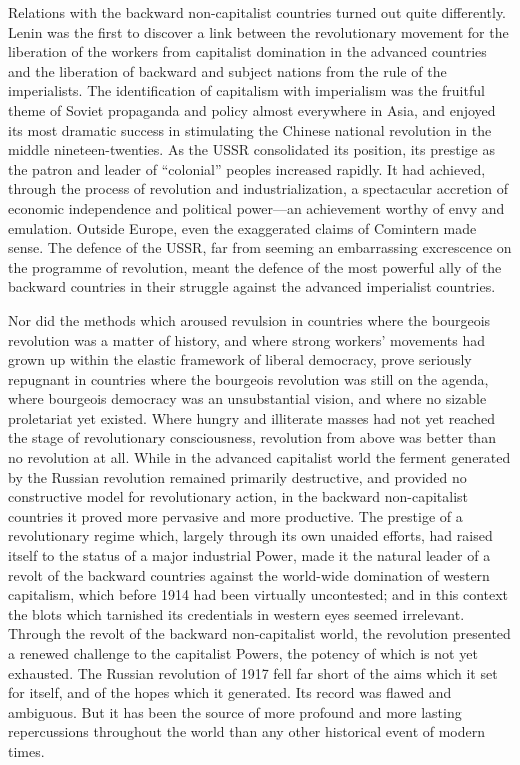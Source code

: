Relations with the backward non-capitalist countries turned out quite differently. Lenin was the first to discover a link between the revolutionary movement for the liberation of the workers from capitalist domination in the advanced countries and the liberation of backward and subject nations from the rule of the imperialists. The identification of capitalism with imperialism was the fruitful theme of Soviet propaganda and policy almost everywhere in Asia, and enjoyed its most dramatic success in stimulating the Chinese national revolution in the middle nineteen-twenties. As the USSR consolidated its position, its prestige as the patron and leader of ``colonial'' peoples increased rapidly. It had achieved, through the process of revolution and industrialization, a spectacular accretion of economic independence and political power---an achievement worthy of envy and emulation. Outside Europe, even the exaggerated claims of Comintern made sense. The defence of the USSR, far from seeming an embarrassing excrescence on the programme of revolution, meant the defence of the most powerful ally of the backward countries in their struggle against the advanced imperialist countries. 

Nor did the methods which aroused revulsion in countries where the bourgeois revolution was a matter of history, and where strong workers' movements had grown up within the elastic framework of liberal democracy, prove seriously repugnant in countries where the bourgeois revolution was still on the agenda, where bourgeois democracy was an unsubstantial vision, and where no sizable proletariat yet existed. Where hungry and illiterate masses had not yet reached the stage of revolutionary consciousness, revolution from above was better than no revolution at all. While in the advanced capitalist world the ferment generated by the Russian revolution remained primarily destructive, and provided no constructive model for revolutionary action, in the backward non-capitalist countries it proved more pervasive and more productive. The prestige of a revolutionary regime which, largely through its own unaided efforts, had raised itself to the status of a major industrial Power, made it the natural leader of a revolt of the backward countries against the world-wide domination of western capitalism, which before 1914 had been virtually uncontested; and in this context the blots which tarnished its credentials in western eyes seemed irrelevant. Through the revolt of the backward non-capitalist world, the revolution presented a renewed challenge to the capitalist Powers, the potency of which is not yet exhausted. The Russian revolution of 1917 fell far short of the aims which it set for itself, and of the hopes which it generated. Its record was flawed and ambiguous. But it has been the source of more profound and more lasting repercussions throughout the world than any other historical event of modern times.